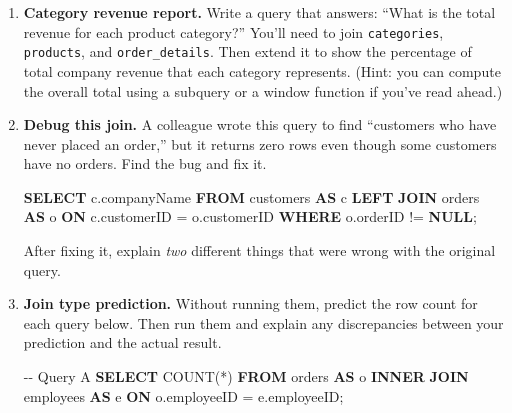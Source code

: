 \documentclass[
  letterpaper,
  DIV=11,
  numbers=noendperiod]{scrreprt}
\newenvironment{Shaded}{\begin{snugshade}}{\end{snugshade}}
\newcommand{\CommentTok}[1]{\textcolor[rgb]{0.37,0.37,0.37}{#1}}
\newcommand{\FunctionTok}[1]{\textcolor[rgb]{0.28,0.35,0.67}{#1}}
\newcommand{\KeywordTok}[1]{\textcolor[rgb]{0.00,0.23,0.31}{\textbf{#1}}}
\newcommand{\NormalTok}[1]{\textcolor[rgb]{0.00,0.23,0.31}{#1}}
\newcommand{\OperatorTok}[1]{\textcolor[rgb]{0.37,0.37,0.37}{#1}}
\begin{document}
\begin{enumerate}
\begin{codelisting}
  \end{codelisting}

  Is this query correct? Explain why or why not by tracing the grain at
  each join step. Then modify it to also show the number of distinct
  orders each customer placed (not the number of line items).
\item
  \textbf{Category revenue report.} Write a query that answers: ``What
  is the total revenue for each product category?'' You'll need to join
  \texttt{categories}, \texttt{products}, and \texttt{order\_details}.
  Then extend it to show the percentage of total company revenue that
  each category represents. (Hint: you can compute the overall total
  using a subquery or a window function if you've read ahead.)
\item
  \textbf{Debug this join.} A colleague wrote this query to find
  ``customers who have never placed an order,'' but it returns zero rows
  even though some customers have no orders. Find the bug and fix it.

  \begin{codelisting}

  \caption{\texttt{duckdb}}

\begin{Shaded}
\begin{Highlighting}[]
\KeywordTok{SELECT}\NormalTok{ c.companyName}
\KeywordTok{FROM}\NormalTok{ customers }\KeywordTok{AS}\NormalTok{ c}
\KeywordTok{LEFT} \KeywordTok{JOIN}\NormalTok{ orders }\KeywordTok{AS}\NormalTok{ o }\KeywordTok{ON}\NormalTok{ c.customerID }\OperatorTok{=}\NormalTok{ o.customerID}
\KeywordTok{WHERE}\NormalTok{ o.orderID }\OperatorTok{!=} \KeywordTok{NULL}\NormalTok{;}
\end{Highlighting}
\end{Shaded}

  \end{codelisting}

  After fixing it, explain \emph{two} different things that were wrong
  with the original query.
\item
  \textbf{Join type prediction.} Without running them, predict the row
  count for each query below. Then run them and explain any
  discrepancies between your prediction and the actual result.

  \begin{codelisting}

  \caption{\texttt{duckdb}}

\begin{Shaded}
\begin{Highlighting}[]
\CommentTok{{-}{-} Query A}
\KeywordTok{SELECT} \FunctionTok{COUNT}\NormalTok{(}\OperatorTok{*}\NormalTok{)}
\KeywordTok{FROM}\NormalTok{ orders }\KeywordTok{AS}\NormalTok{ o}
\KeywordTok{INNER} \KeywordTok{JOIN}\NormalTok{ employees }\KeywordTok{AS}\NormalTok{ e }\KeywordTok{ON}\NormalTok{ o.employeeID }\OperatorTok{=}\NormalTok{ e.employeeID;}


\end{Highlighting}
\end{Shaded}
\end{codelisting}
\end{enumerate}
\end{document}
